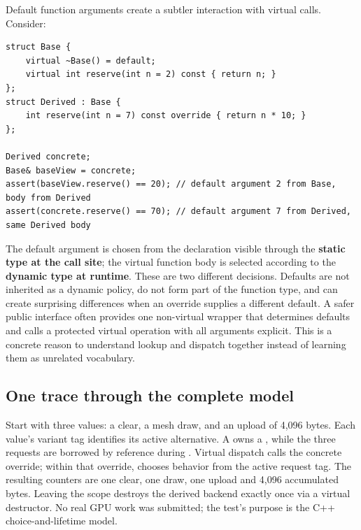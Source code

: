 Default function arguments create a subtler interaction with virtual calls. Consider:

\begin{verbatim}
struct Base {
    virtual ~Base() = default;
    virtual int reserve(int n = 2) const { return n; }
};
struct Derived : Base {
    int reserve(int n = 7) const override { return n * 10; }
};

Derived concrete;
Base& baseView = concrete;
assert(baseView.reserve() == 20); // default argument 2 from Base, body from Derived
assert(concrete.reserve() == 70); // default argument 7 from Derived, same Derived body
\end{verbatim}

The default argument is chosen from the declaration visible through the \textbf{static type at the call site}; the virtual function body is selected according to the \textbf{dynamic type at runtime}. These are two different decisions. Defaults are not inherited as a dynamic policy, do not form part of the function type, and can create surprising differences when an override supplies a different default. A safer public interface often provides one non-virtual wrapper that determines defaults and calls a protected virtual operation with all arguments explicit. This is a concrete reason to understand lookup and dispatch together instead of learning them as unrelated vocabulary.

\subsection{One trace through the complete model}\label{01-foundations-i-ch004-one-trace-through-the-complete-model}

\hypertarget{01-foundations-i-ch004-one-trace-through-the-complete-model}{}

Start with three  values: a clear, a mesh draw, and an upload of 4,096 bytes. Each value's variant tag identifies its active alternative. A  owns a , while the three requests are borrowed by reference during . Virtual dispatch calls the concrete override; within that override,  chooses behavior from the active request tag. The resulting counters are one clear, one draw, one upload and 4,096 accumulated bytes. Leaving the scope destroys the derived backend exactly once via a virtual destructor. No real GPU work was submitted; the test's purpose is the C++ choice-and-lifetime model.

